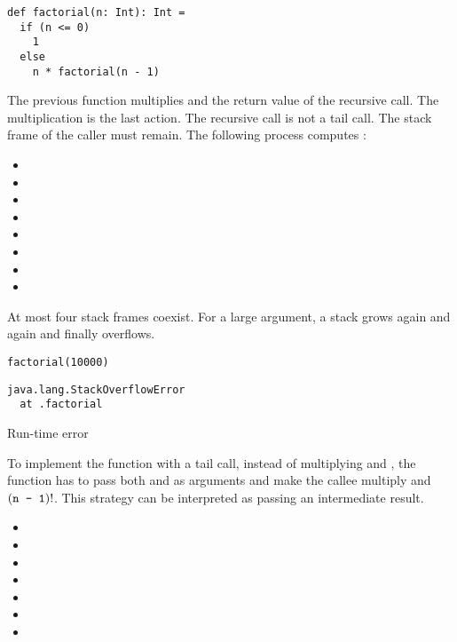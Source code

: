 \begin{verbatim}
def factorial(n: Int): Int =
  if (n <= 0)
    1
  else
    n * factorial(n - 1)
\end{verbatim}

The previous  function multiplies  and the return value
of the recursive  call. The multiplication is the last
action. The recursive call is not a tail call. The stack frame of the caller must
remain. The following process computes :

\begin{itemize}
\item {}
\item {}
\item {}
\item {}
\item {}
\item {}
\item {}
\item {}
\end{itemize}

At most four stack frames coexist. For a large argument, a stack grows
again and again and finally overflows.

\begin{verbatim}
factorial(10000)
\end{verbatim}
\vspace{-1em}
\begin{mdframed}[hidealllines=true,backgroundcolor=red!10,innerleftmargin=3pt,innerrightmargin=3pt,leftmargin=-3pt,rightmargin=-3pt]
\begin{verbatim}
java.lang.StackOverflowError
  at .factorial
\end{verbatim}
\vspace{-2em}
\begin{flushright}
\scriptsize\textsf{Run-time error}
\end{flushright}
\end{mdframed}

To implement the function with a tail call, instead of multiplying  and
, the function has to pass both  and 
as arguments and make the callee multiply  and $(\texttt{n - 1})!$.
This strategy can be interpreted as passing an intermediate result.

\begin{itemize}
\item {}
\item {}
\item {}
\item {}
\item {}
\item {}
\item {}
\end{itemize}

